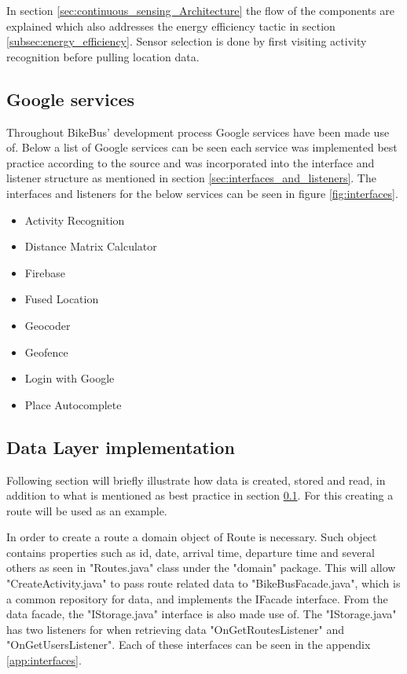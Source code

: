 In section \ref{sec:continuous_sensing_Architecture} the flow of the components are explained which also addresses the energy efficiency tactic in section \ref{subsec:energy_efficiency}. Sensor selection is done by first visiting activity recognition before pulling location data.   

\subsection{Google services}
\label{section:google_services}
Throughout BikeBus' development process Google services have been made use of. Below a list of Google services can be seen each service was implemented best practice according to the source and was incorporated into the interface and listener structure as mentioned in section \ref{sec:interfaces_and_listeners}. The interfaces and listeners for the below services can be seen in figure \ref{fig:interfaces}.\\


\begin{itemize}
    \item Activity Recognition \cite{googleActivityRecognition}
    \item Distance Matrix Calculator \cite{googleDistanceMatrix}
    \item Firebase \cite{googleFirebase}
    \item Fused Location \cite{googleFusedLocation}
    \item Geocoder \cite{googleGeocoder}
    \item Geofence \cite{googleGeofencing}
    \item Login with Google \cite{googleActivityRecognition}
    \item Place Autocomplete \cite{googleAutocomplete}
\end{itemize}

\subsection{Data Layer implementation}
Following section will briefly illustrate how data is created, stored and read, in addition to what is mentioned as best practice in section \ref{section:google_services}. For this creating a route will be used as an example. 

In order to create a route a domain object of Route is necessary. Such object contains properties such as id, date, arrival time, departure time and several others as seen in "Routes.java" class under the "domain" package. This will allow "CreateActivity.java" to pass route related data to "BikeBusFacade.java", which is a common repository for data, and implements the IFacade interface. From the data facade, the "IStorage.java" interface is also made use of. The "IStorage.java" has two listeners for when retrieving data "OnGetRoutesListener" and "OnGetUsersListener". Each of these interfaces can be seen in the appendix \ref{app:interfaces}.

